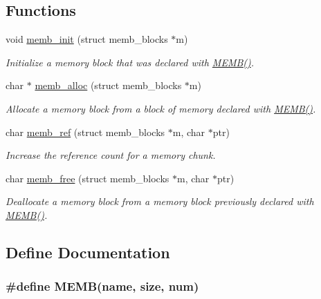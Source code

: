 \subsection*{Functions}
\begin{CompactItemize}
\item 
void \hyperlink{a00060_gd58a6c7e62ae59bf7a016ded12ca2910}{memb\_\-init} (struct memb\_\-blocks $\ast$m)
\begin{CompactList}\small\item\em Initialize a memory block that was declared with \hyperlink{a00060_g8457539d6a6eaecded820f4042b8314a}{MEMB()}. \item\end{CompactList}\item 
char $\ast$ \hyperlink{a00060_g73bf7c370e6ada339f102d4c9768e48c}{memb\_\-alloc} (struct memb\_\-blocks $\ast$m)
\begin{CompactList}\small\item\em Allocate a memory block from a block of memory declared with \hyperlink{a00060_g8457539d6a6eaecded820f4042b8314a}{MEMB()}. \item\end{CompactList}\item 
char \hyperlink{a00060_ga02c1627ee9488468c8cdef7fed74d91}{memb\_\-ref} (struct memb\_\-blocks $\ast$m, char $\ast$ptr)
\begin{CompactList}\small\item\em Increase the reference count for a memory chunk. \item\end{CompactList}\item 
char \hyperlink{a00060_g7174da2ea729ba661256d123f08ed272}{memb\_\-free} (struct memb\_\-blocks $\ast$m, char $\ast$ptr)
\begin{CompactList}\small\item\em Deallocate a memory block from a memory block previously declared with \hyperlink{a00060_g8457539d6a6eaecded820f4042b8314a}{MEMB()}. \item\end{CompactList}\end{CompactItemize}


\subsection{Define Documentation}
\hypertarget{a00060_g8457539d6a6eaecded820f4042b8314a}{
\subsubsection[MEMB]{\setlength{\rightskip}{0pt plus 5cm}\#define MEMB(name, size, num)}}
\label{a00060_g8457539d6a6eaecded820f4042b8314a}


